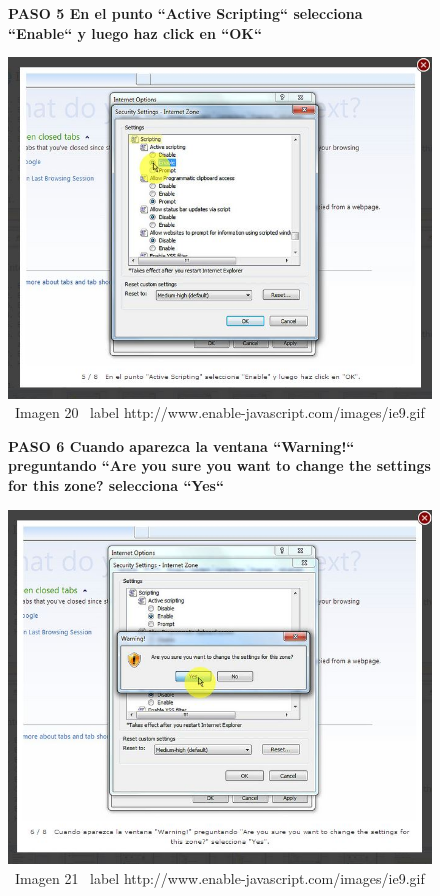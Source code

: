 \documentclass[11pt]{article} %
\begin{document}
\begin{figure}
\begin{center}

\begin{center}
\bf PASO 5
En el punto ``Active Scripting`` selecciona ``Enable`` y luego haz click en ``OK``
\end{center}
\includegraphics[height=8 cm, width=8 cm] {imagenes/explorer 05.JPG}
\newline
\newline
\ Imagen 20
\ label {http://www.enable-javascript.com/images/ie9.gif }
\newline

\begin{center}
\bf PASO 6
Cuando aparezca la ventana ``Warning!``  preguntando  ``Are you sure you want to change the settings for this zone?  selecciona ``Yes``
\end{center}
\includegraphics[height=8 cm, width=8 cm] {imagenes/explorer 06.JPG}
\newline
\newline
\ Imagen 21
\ label {http://www.enable-javascript.com/images/ie9.gif }

\end{center}
\end{figure}
\end{document}
